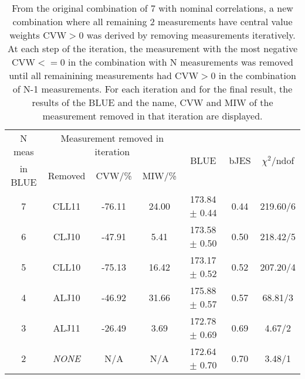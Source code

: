 \begin{table}[H]
\scriptsize
\begin{center}
\renewcommand{\arraystretch}{1.2}
\begin{tabular}{|c|c|c|c|c|c|c|}
\hline
N {\tiny meas} & \multicolumn{3}{c|}{Measurement removed in iteration} & \multirow{2}{*}{BLUE} & \multirow{2}{*}{\tiny bJES} & \multirow{2}{*}{\tiny$\chi^2$/ndof}\\
\cline{2-4}
{\tiny in BLUE} & Removed & CVW/\% & MIW/\% & & & \\\hline
7 & CLL11 &     -76.11 &      24.00 &     173.84 $\pm$      0.44 &       0.44 &     219.60/6 \\
6 & CLJ10 &     -47.91 &       5.41 &     173.58 $\pm$      0.50 &       0.50 &     218.42/5 \\
5 & CLL10 &     -75.13 &      16.42 &     173.17 $\pm$      0.52 &       0.52 &     207.20/4 \\
4 & ALJ10 &     -46.92 &      31.66 &     175.88 $\pm$      0.57 &       0.57 &      68.81/3 \\
3 & ALJ11 &     -26.49 &       3.69 &     172.78 $\pm$      0.69 &       0.69 &       4.67/2 \\
\hline
2 & {\em NONE} & N/A & N/A & 
    172.64 $\pm$      0.70 &       0.70 &       3.48/1 \\
\hline
\end{tabular}
\caption{From the original combination of 7 with nominal correlations, a new combination where all remaining 2 measurements have central value weights CVW$>$0 was derived by removing measurements iteratively. At each step of the iteration, the measurement with the most negative CVW$<=$0 in the combination with N measurements was removed until all remainining measurements had CVW$>$0 in the combination of N-1 measurements. For each iteration and for the final result, the results of the BLUE and the name, CVW and MIW of the measurement removed in that iteration are displayed.}
\renewcommand{\arraystretch}{1}
\end{center}
\end{table}
